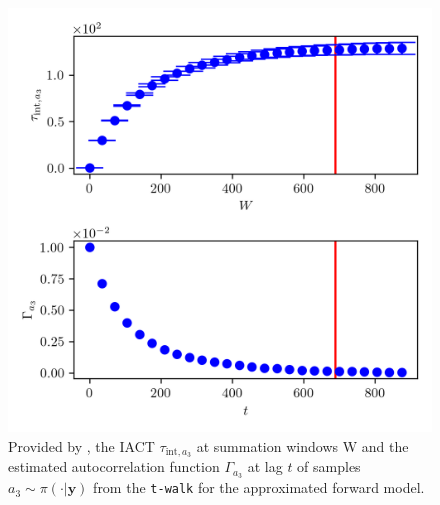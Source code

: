 \begin{figure}[ht!]
	\centering
	\includegraphics{UwerrTauIntTWalk11.png}
	\caption[IACT and autocorrelation function of samples $a_3 \sim \pi(\cdot|\bm{y})$, for approximated model.]{Provided by \cite{drikHesse}, the IACT $\tau_{\text{int},a_3}$ at summation windows W and the estimated autocorrelation function $\Gamma_{a_3}$ at lag $t$ of samples $a_3 \sim \pi( \cdot| \bm{y})$ from the \texttt{t-walk} for the approximated forward model.}
	\label{fig:TWalkIATC12}
\end{figure}
